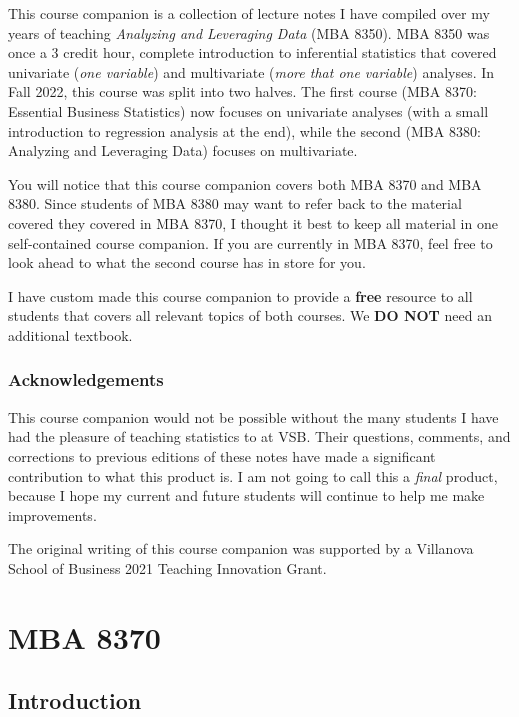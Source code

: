 \documentclass[
]{book}
\begin{document}
This course companion is a collection of lecture notes I have compiled over my years of teaching \emph{Analyzing and Leveraging Data} (MBA 8350). MBA 8350 was once a 3 credit hour, complete introduction to inferential statistics that covered univariate (\emph{one variable}) and multivariate (\emph{more that one variable}) analyses. In Fall 2022, this course was split into two halves. The first course (MBA 8370: Essential Business Statistics) now focuses on univariate analyses (with a small introduction to regression analysis at the end), while the second (MBA 8380: Analyzing and Leveraging Data) focuses on multivariate.

You will notice that this course companion covers both MBA 8370 and MBA 8380. Since students of MBA 8380 may want to refer back to the material covered they covered in MBA 8370, I thought it best to keep all material in one self-contained course companion. If you are currently in MBA 8370, feel free to look ahead to what the second course has in store for you.

I have custom made this course companion to provide a \textbf{free} resource to all students that covers all relevant topics of both courses. We \textbf{DO NOT} need an additional textbook.

\hypertarget{acknowledgements}{%
\section*{Acknowledgements}\label{acknowledgements}}

This course companion would not be possible without the many students I have had the pleasure of teaching statistics to at VSB. Their questions, comments, and corrections to previous editions of these notes have made a significant contribution to what this product is. I am not going to call this a \emph{final} product, because I hope my current and future students will continue to help me make improvements.

The original writing of this course companion was supported by a Villanova School of Business 2021 Teaching Innovation Grant.

\hypertarget{part-mba-8370}{%
\part*{MBA 8370}\label{part-mba-8370}}

\hypertarget{intro}{%
\chapter{Introduction}\label{intro}}
\end{document}

